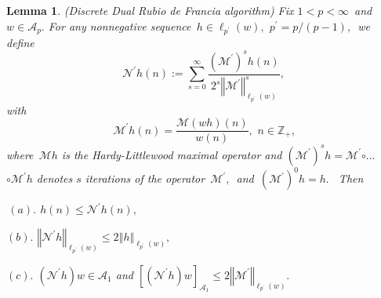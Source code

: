 \documentclass[a4paper]{amsart}
\theoremstyle{plain}
\newtheorem{lemma}{Lemma}[section]
\numberwithin{equation}{section}
\begin{document}
\begin{lemma}
\label{L1}(Discrete Dual Rubio de Francia algorithm) Fix $1<p<\infty $\ and\ 
$w\in \mathcal{A}_{p}.$ For any nonnegative sequence\ $h\in \ell _{p^{\prime
}}(w),$ $p^{\prime }=p/(p-1),$\ we define 
\begin{equation}
\mathcal{N}^{\prime }h(n):=\sum_{s=0}^{\infty }\frac{\left( \mathcal{M}%
^{\prime }\right) ^{s}h(n)}{2^{s}\left\Vert \mathcal{M}^{\prime }\right\Vert
_{\ell _{p^{\prime }}(w)}^{s}},  \label{r}
\end{equation}%
with%
\begin{equation}
\mathcal{M}^{\prime }h(n)=\frac{\mathcal{M}\left( wh\right) (n)}{w(n)},\text{
\ }n\in \mathbb{Z}_{+}\text{,}  \label{r1}
\end{equation}%
where\ $\mathcal{M}h$ is the Hardy-Littlewood maximal operator and $\left( 
\mathcal{M}^{\prime }\right) ^{s}h=\mathcal{M}^{\prime }\mathcal{\circ }...$ 
$\mathcal{\circ M}^{\prime }h$ denotes $s$ iterations of the operator\ $%
\mathcal{M}^{\prime },$\ and\ $\left( \mathcal{M}^{\prime }\right) ^{0}h=h.$%
\ Then

$\,(a).$ $h(n)\leq \mathcal{N}^{\prime }h(n),$

$(b).$ $\left\Vert \mathcal{N}^{\prime }h\right\Vert _{\ell _{p^{\prime
}}(w)}\leq 2\left\Vert h\right\Vert _{\ell _{p^{\prime }}(w)},$

$(c).$ $\left( \mathcal{N}^{\prime }h\right) w\in \mathcal{A}_{1}$ and $%
\left[ \left( \mathcal{N}^{\prime }h\right) w\right] _{\mathcal{A}_{1}}\leq
2\left\Vert \mathcal{M}^{\prime }\right\Vert _{\ell _{p^{\prime }}(w)}.$
\end{lemma}
\end{document}
